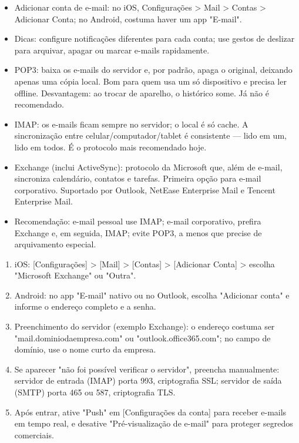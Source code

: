 
\begin{itemize}
  \item Adicionar conta de e-mail: no iOS, Configurações > Mail > Contas > Adicionar Conta; no Android, costuma haver um app "E-mail".
  \item Dicas: configure notificações diferentes para cada conta; use gestos de deslizar para arquivar, apagar ou marcar e-mails rapidamente.
\end{itemize}


\begin{itemize}
  \item POP3: baixa os e-mails do servidor e, por padrão, apaga o original, deixando apenas uma cópia local. Bom para quem usa um só dispositivo e precisa ler offline. Desvantagem: ao trocar de aparelho, o histórico some. Já não é recomendado.
  \item IMAP: os e-mails ficam sempre no servidor; o local é só cache. A sincronização entre celular/computador/tablet é consistente — lido em um, lido em todos. É o protocolo mais recomendado hoje.
  \item Exchange (inclui ActiveSync): protocolo da Microsoft que, além de e-mail, sincroniza calendário, contatos e tarefas. Primeira opção para e-mail corporativo. Suportado por Outlook, NetEase Enterprise Mail e Tencent Enterprise Mail.
  \item Recomendação: e-mail pessoal use IMAP; e-mail corporativo, prefira Exchange e, em seguida, IMAP; evite POP3, a menos que precise de arquivamento especial.
\end{itemize}


\begin{enumerate}
  \item iOS: [Configurações] > [Mail] > [Contas] > [Adicionar Conta] > escolha "Microsoft Exchange" ou "Outra".
  \item Android: no app "E-mail" nativo ou no Outlook, escolha "Adicionar conta" e informe o endereço completo e a senha.
  \item Preenchimento do servidor (exemplo Exchange): o endereço costuma ser "mail.dominiodaempresa.com" ou "outlook.office365.com"; no campo de domínio, use o nome curto da empresa.
  \item Se aparecer "não foi possível verificar o servidor", preencha manualmente: servidor de entrada (IMAP) porta 993, criptografia SSL; servidor de saída (SMTP) porta 465 ou 587, criptografia TLS.
  \item Após entrar, ative "Push" em [Configurações da conta] para receber e-mails em tempo real, e desative "Pré-visualização de e-mail" para proteger segredos comerciais.
\end{enumerate}

